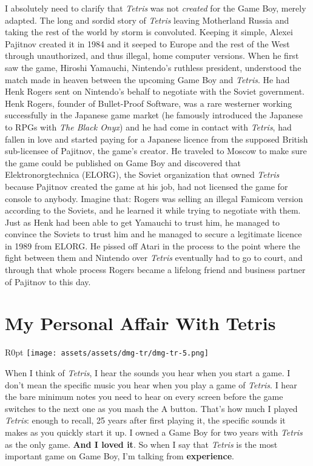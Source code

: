 \documentclass{book}
\begin{document}
I absolutely need to clarify that \emph{Tetris} was not \emph{created} for the Game Boy, merely adapted. The long and sordid story of \emph{Tetris} leaving Motherland Russia and taking the rest of the world by storm is convoluted. Keeping it simple, Alexei Pajitnov created it in 1984 and it seeped to Europe and the rest of the West through unauthorized, and thus illegal, home computer versions. When he first saw the game, Hiroshi Yamauchi, Nintendo’s ruthless president, understood the match made in heaven between the upcoming Game Boy and \emph{Tetris}. He had Henk Rogers sent on Nintendo’s behalf to negotiate with the Soviet government. Henk Rogers, founder of Bullet-Proof Software, was a rare westerner working successfully in the Japanese game market (he famously introduced the Japanese to RPGs with \emph{The Black Onyx}) and he had come in contact with \emph{Tetris}, had fallen in love and started paying for a Japanese licence from the supposed British sub-licensee of Pajitnov, the game’s creator. He traveled to Moscow to make sure the game could be published on Game Boy and discovered that Elektronorgtechnica (ELORG), the Soviet organization that owned \emph{Tetris} because Pajitnov created the game at his job, had not licensed the game for console to anybody. Imagine that: Rogers was selling an illegal Famicom version according to the Soviets, and he learned it while trying to negotiate with them. Just as Henk had been able to get Yamauchi to trust him, he managed to convince the Soviets to trust him and he managed to secure a legitimate licence in 1989 from ELORG. He pissed off Atari in the process to the point where the fight between them and Nintendo over \emph{Tetris} eventually had to go to court, and through that whole process Rogers became a lifelong friend and business partner of Pajitnov to this day.

\FloatBarrier\needspace{5pt}\section*{My Personal Affair With Tetris}\nopagebreak[4]

\begin{wrapfigure}{R}{0pt} \texttt{[image: assets/assets/dmg-tr/dmg-tr-5.png]}\end{wrapfigure}
When I think of \emph{Tetris}, I hear the sounds you hear when you start a game. I don’t mean the specific music you hear when you play a game of \emph{Tetris}. I hear the bare minimum notes you need to hear on every screen before the game switches to the next one as you mash the A button. That’s how much I played \emph{Tetris}: enough to recall, 25 years after first playing it, the specific sounds it makes as you quickly start it up. I owned a Game Boy for two years with \emph{Tetris} as the only game. \textbf{And I loved it}. So when I say that \emph{Tetris} is the most important game on Game Boy, I’m talking from \textbf{experience}.
\end{document}
